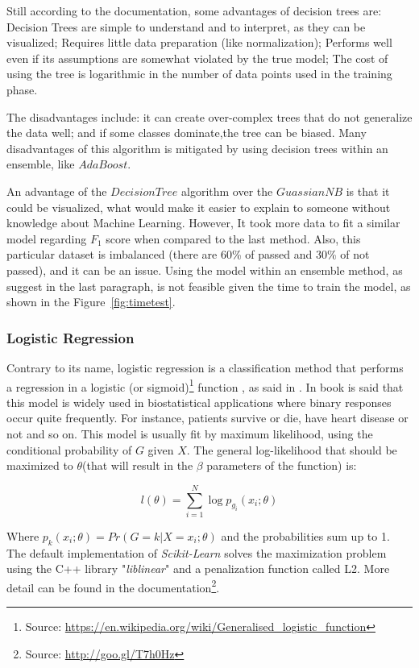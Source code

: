 \documentclass[a4paper]{article}
\begin{document}
Still according to the documentation, some advantages of decision trees are: Decision Trees are simple to understand and to interpret, as they can be visualized; Requires little data preparation (like normalization); Performs well even if its assumptions are somewhat violated by the true model; The cost of using the tree is logarithmic in the number of data points used in the training phase.

The disadvantages include: it can create over-complex trees that do not generalize the data well; and if some classes dominate,the tree can be biased. Many disadvantages of this algorithm is mitigated by using decision trees within an ensemble, like $AdaBoost$.

An advantage of the $Decision Tree$ algorithm over the $GuassianNB$ is that it could be visualized, what would make it easier to explain to someone without knowledge about Machine Learning. However, It took more data to fit a similar model regarding $F_1$ score when compared to the last method. Also, this particular dataset is imbalanced (there are 60\% of passed and 30\% of not passed), and it can be an issue. Using the model within an ensemble method, as suggest in the last paragraph, is not feasible given the time to train the model, as shown in the Figure~\ref{fig:timetest}.

\subsubsection{Logistic Regression}
Contrary to its name, logistic regression is a classification method that performs a regression in a logistic (or sigmoid)\footnote{Source: \url{https://en.wikipedia.org/wiki/Generalised_logistic_function}} function , as said in \cite{richert2013building}. In \cite{Hastie_2009} book is said that this model is widely used in biostatistical applications where binary responses occur quite frequently. For instance, patients survive or die, have heart disease or not and so on. This model is usually fit by maximum likelihood, using the conditional probability of $G$ given $X$. The general log-likelihood that should be maximized to $\theta$(that will result in the $\beta$ parameters of the function) is:

$$l(\theta) = \sum_{i=1}^{N} \log{p_{g_{i}}(x_i; \theta)}$$

Where $p_{k}(x_i ; \theta) = Pr(G=k | X = x_i ; \theta)$ and the probabilities sum up to 1. The default implementation of \textit{Scikit-Learn }solves the maximization problem using the C++ library "\textit{liblinear}" and a penalization function called L2. More detail can be found in the documentation\footnote{Source: \url{http://goo.gl/T7h0Hz}}.
\end{document}
